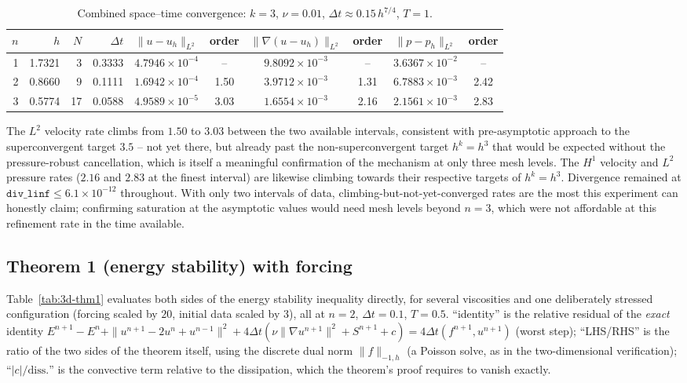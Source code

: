 \documentclass[11pt]{article}
\begin{document}
\begin{table}[h]\centering
\caption{Combined space--time convergence: $k=3$, $\nu=0.01$,
$\Delta t\approx0.15\,h^{7/4}$, $T=1$.}
\label{tab:3d-combined}
\begin{tabular}{rrrrcccccc}
\toprule
$n$ & $h$ & $N$ & $\Delta t$ & $\|u-u_h\|_{L^2}$ & order & $\|\nabla(u-u_h)\|_{L^2}$ & order & $\|p-p_h\|_{L^2}$ & order \\
\midrule
1 & 1.7321 & 3  & 0.3333 & $4.7946\times10^{-4}$ & --   & $9.8092\times10^{-3}$ & --   & $3.6367\times10^{-2}$ & --   \\
2 & 0.8660 & 9  & 0.1111 & $1.6942\times10^{-4}$ & 1.50 & $3.9712\times10^{-3}$ & 1.31 & $6.7883\times10^{-3}$ & 2.42 \\
3 & 0.5774 & 17 & 0.0588 & $4.9589\times10^{-5}$ & 3.03 & $1.6554\times10^{-3}$ & 2.16 & $2.1561\times10^{-3}$ & 2.83 \\
\bottomrule
\end{tabular}
\end{table}

The $L^2$ velocity rate climbs from $1.50$ to $3.03$ between the two available intervals,
consistent with pre-asymptotic approach to the superconvergent target $3.5$ -- not yet
there, but already past the non-superconvergent target $h^k=h^3$ that would be expected
without the pressure-robust cancellation, which is itself a meaningful confirmation of the
mechanism at only three mesh levels. The $H^1$ velocity and $L^2$ pressure rates ($2.16$
and $2.83$ at the finest interval) are likewise climbing towards their respective targets
of $h^k=h^3$. Divergence remained at $\mathtt{div\_linf}\le6.1\times10^{-12}$ throughout.
With only two intervals of data, climbing-but-not-yet-converged rates are the most this
experiment can honestly claim; confirming saturation at the asymptotic values would need
mesh levels beyond $n=3$, which were not affordable at this refinement rate in the time
available.

\subsection{Theorem 1 (energy stability) with forcing}
\label{sec:3d-theorem1}

Table~\ref{tab:3d-thm1} evaluates both sides of the energy stability inequality directly,
for several viscosities and one deliberately stressed configuration (forcing scaled by
$20$, initial data scaled by $3$), all at $n=2$, $\Delta t=0.1$, $T=0.5$. ``identity''
is the relative residual of the \emph{exact} identity
$E^{n+1}-E^n+\|u^{n+1}-2u^n+u^{n-1}\|^2+4\Delta t(\nu\|\nabla u^{n+1}\|^2+S^{n+1}+c)=
4\Delta t(f^{n+1},u^{n+1})$ (worst step); ``LHS/RHS'' is the ratio of the two sides of the
theorem itself, using the discrete dual norm $\|f\|_{-1,h}$ (a Poisson solve, as in the
two-dimensional verification); ``$|c|/\mathrm{diss.}$'' is the convective term relative to
the dissipation, which the theorem's proof requires to vanish exactly.
\end{document}
